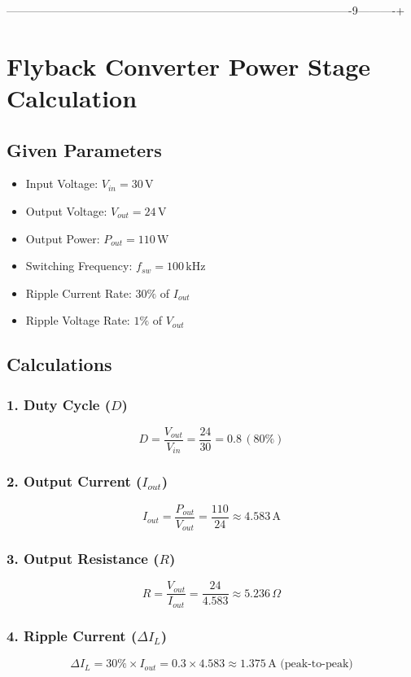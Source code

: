 -------------------------------------------------------------------------------------------9----------+\documentclass{article}
\begin{document}
\section*{Flyback Converter Power Stage Calculation}

\subsection*{Given Parameters}
\begin{itemize}
    \item Input Voltage: \( V_{in} = 30\, \text{V} \)
    \item Output Voltage: \( V_{out} = 24\, \text{V} \)
    \item Output Power: \( P_{out} = 110\, \text{W} \)
    \item Switching Frequency: \( f_{sw} = 100\, \text{kHz} \)
    \item Ripple Current Rate: \( 30\% \) of \( I_{out} \)
    \item Ripple Voltage Rate: \( 1\% \) of \( V_{out} \)
\end{itemize}

\subsection*{Calculations}

\subsubsection*{1. Duty Cycle (\( D \))}
\[
D = \frac{V_{out}}{V_{in}} = \frac{24}{30} = \boxed{0.8 \, (80\%)}
\]

\subsubsection*{2. Output Current (\( I_{out} \))}
\[
I_{out} = \frac{P_{out}}{V_{out}} = \frac{110}{24} \approx \boxed{4.583\, \text{A}}
\]

\subsubsection*{3. Output Resistance (\( R \))}
\[
R = \frac{V_{out}}{I_{out}} = \frac{24}{4.583} \approx \boxed{5.236\, \Omega}
\]

\subsubsection*{4. Ripple Current (\( \Delta I_L \))}
\[
\Delta I_L = 30\% \times I_{out} = 0.3 \times 4.583 \approx \boxed{1.375\, \text{A (peak-to-peak)}}
\]
\end{document}
